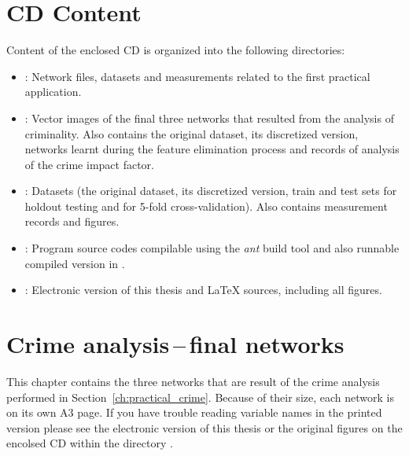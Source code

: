 \chapter{CD Content}\label{ch:appendix_cd_content}
Content of the enclosed CD is organized into the following directories:
\begin{itemize}
    \item {}: Network  files, datasets and measurements related to the first practical application.
    \item {}: Vector images of the final three networks that resulted from the analysis of criminality. Also contains the original dataset, its discretized version, networks learnt during the feature elimination process and records of analysis of the crime impact factor.
    \item {}: Datasets (the original dataset, its discretized version, train and test sets for holdout testing and for 5-fold cross-validation). Also contains measurement records and figures.
    \item {}: Program source codes compilable using the \emph{ant} build tool and also runnable compiled version in .
    \item {}:  Electronic version of this thesis and {\LaTeX} sources, including all figures.
\end{itemize} 





\chapter{Crime analysis\,--\,final networks}\label{ch:appendix_crime_net}
This chapter contains the three networks that are result of the crime analysis performed in Section~\ref{ch:practical_crime}. Because of their size, each network is on its own A3 page. If you have trouble reading variable names in the printed version please see the electronic version of this thesis or the original figures on the encolsed CD within the directory .


